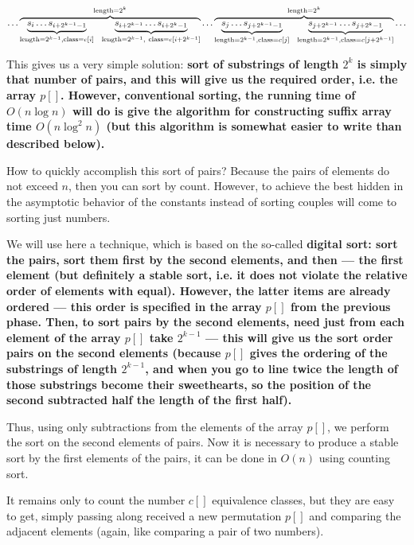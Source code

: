 $$ \ldots \overbrace{ \underbrace{ s_i \ldots s_{i+2^{k-1}-1} }_{{\rm length}=2^{k-1},{\rm class}=c[i]}\ \ \underbrace{ s_{i+2^{k-1}} \ldots s_{i+2^k-1} }_{{\rm length}=2^{k-1},\ {\rm class}=c[i+2^{k-1}]} }^{{\rm length}=2^k} \ldots \overbrace{ \underbrace{ s_j \ldots s_{j+2^{k-1}-1} }_{{\rm length}=2^{k-1},{\rm class}=c[j]}\ \ \underbrace{ s_{j+2^{k-1}} \ldots s_{j+2^k-1} }_{{\rm length}=2^{k-1},{\rm class}=c[j+2^{k-1}]} }^{{\rm length}=2^k} \ldots $$

This gives us a very simple solution: \bf{sort} of substrings of length $2^k$ is simply \bf {} that \bf{number of pairs}, and this will give us the required order, i.e. the array $p[]$. However, conventional sorting, the running time of $O(n \log n)$ will do is give the algorithm for constructing suffix array time $O(n \log^2 n)$ (but this algorithm is somewhat easier to write than described below).

How to quickly accomplish this sort of pairs? Because the pairs of elements do not exceed $n$, then you can sort by count. However, to achieve the best hidden in the asymptotic behavior of the constants instead of sorting couples will come to sorting just numbers.

We will use here a technique, which is based on the so-called \bf{digital sort}: sort the pairs, sort them first by the second elements, and then --- the first element (but definitely a stable sort, i.e. it does not violate the relative order of elements with equal). However, the latter items are already ordered --- this order is specified in the array $p[]$ from the previous phase. Then, to sort pairs by the second elements, need just from each element of the array $p[]$ take $2^{k-1}$ --- this will give us the sort order pairs on the second elements (because $p[]$ gives the ordering of the substrings of length $2^{k-1}$, and when you go to line twice the length of those substrings become their sweethearts, so the position of the second subtracted half the length of the first half).

Thus, using only subtractions from the elements of the array $p []$, we perform the sort on the second elements of pairs. Now it is necessary to produce a stable sort by the first elements of the pairs, it can be done in $O(n)$ using counting sort.

It remains only to count the number $c[]$ equivalence classes, but they are easy to get, simply passing along received a new permutation $p[]$ and comparing the adjacent elements (again, like comparing a pair of two numbers).

